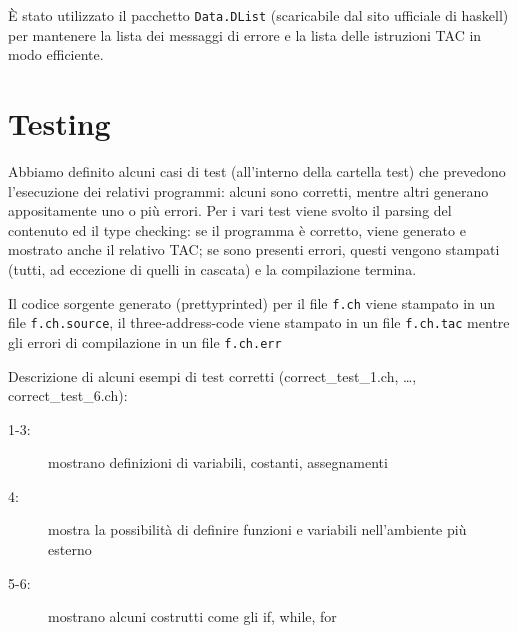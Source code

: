 \documentclass{report}
\newcommand{\term}[1]{\texttt{#1}}
\begin{document}
È stato utilizzato il pacchetto \term{Data.DList} (scaricabile dal sito ufficiale di haskell) per mantenere
la lista dei messaggi di errore e la lista delle istruzioni TAC in modo efficiente.

\section{Testing}

Abbiamo definito alcuni casi di test (all'interno della cartella test) che prevedono l'esecuzione dei
relativi programmi: alcuni sono corretti, mentre altri generano appositamente uno o più errori. Per i vari 
test viene svolto il parsing del contenuto ed il type checking: se il programma è corretto, viene generato 
e mostrato anche il relativo TAC; se sono presenti errori, questi vengono stampati (tutti, ad eccezione
di quelli in cascata) e la compilazione termina.

Il codice sorgente generato (prettyprinted) per il file \term{f.ch} viene stampato in un file \term{f.ch.source},
il three-address-code viene stampato in un file \term{f.ch.tac} mentre gli errori di compilazione in un file
\term{f.ch.err}

Descrizione di alcuni esempi di test corretti (correct\_test\_1.ch, …, correct\_test\_6.ch):
\begin{description}
    \item[1-3:] mostrano definizioni di variabili, costanti, assegnamenti
    \item[4:] mostra la possibilità di definire funzioni e variabili nell'ambiente più esterno
    \item[5-6:] mostrano alcuni costrutti come gli if, while, for

\end{description}
\end{document}
